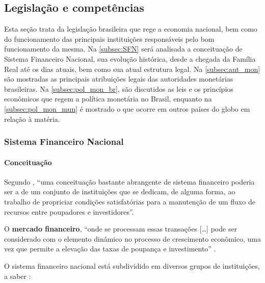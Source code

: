 \documentclass[]{article}
\let\oldparagraph\paragraph
\renewcommand{\paragraph}[1]{\oldparagraph{#1}\mbox{}}
\begin{document}
\subsection{Legislação e competências}\label{legislacao-e-competencias}

Esta seção trata da legislação brasileira que rege a economia nacional,
bem como do funcionamento das principais instituições responsáveis pelo
bom funcionamento da mesma. Na \autoref{subsec:SFN} será analisada a
conceituação de Sistema Financeiro Nacional, sua evolução histórica,
desde a chegada da Família Real até os dias atuais, bem como sua atual
estrutura legal. Na \autoref{subsec:aut_mon} são mostradas as principais
atribuições legais das autoridades monetárias brasileiras. Na
\autoref{subsec:pol_mon_br}, são discutidos as leis e os princípios
econômicos que regem a política monetária no Brasil, enquanto na
\autoref{subsec:pol_mon_mun} é mostrado o que ocorre em outros países do
globo em relação à matéria.

\subsubsection{Sistema Financeiro Nacional}\label{subsec:SFN}

\paragraph{Conceituação}\label{conceituacao}

Segundo , ``uma conceituação bastante
abrangente de sistema financeiro poderia ser a de um conjunto de
instituições que se dedicam, de alguma forma, ao trabalho de propriciar
condições satisfatórias para a manutenção de um fluxo de recursos entre
poupadores e investidores''.

O \textbf{mercado financeiro}, ``onde se processam essas transações
{[}\ldots{}{]} pode ser considerado com o elemento dinâmico no processo
de crescimento econômico, uma vez que permite a elevação das taxas de
poupança e investimento'' \cite[p.~16]{fortuna2015}.

O sistema financeiro nacional está subdividido em diversos grupos de
instituições, a saber \cite[p.~18]{fortuna2015}:
\end{document}
